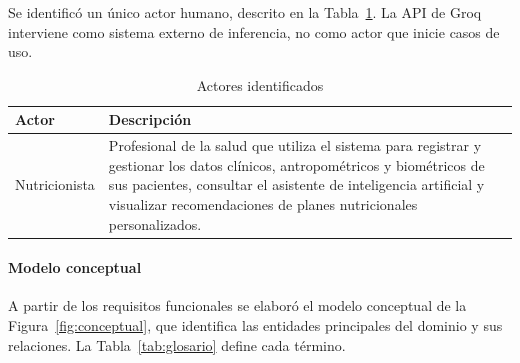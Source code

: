Se identificó un único actor humano, descrito en la Tabla~\ref{tab:actores}.
La API de Groq interviene como sistema externo de inferencia, no como actor
que inicie casos de uso.

\begin{table}[H]
\centering\small
\caption{Actores identificados}\label{tab:actores}
\begin{tabularx}{\linewidth}{|p{2.6cm}|X|}
\hline
\textbf{Actor} & \textbf{Descripción} \\ \hline
Nutricionista & Profesional de la salud que utiliza el sistema para registrar y gestionar los datos clínicos, antropométricos y biométricos de sus pacientes, consultar el asistente de inteligencia artificial y visualizar recomendaciones de planes nutricionales personalizados. \\ \hline
\end{tabularx}
\end{table}

\paragraph{Modelo conceptual}

A partir de los requisitos funcionales se elaboró el modelo conceptual de la
Figura~\ref{fig:conceptual}, que identifica las entidades principales del
dominio y sus relaciones. La Tabla~\ref{tab:glosario} define cada término.


